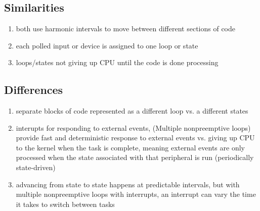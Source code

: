 \section{}
\begin{comment}
  Multiple Nonpreemptive Loops with Interrupts (cont’d)
• Advantages:
– Guaranteed minimum polling frequency for each
input or device
– Guaranteed maximum response time for polled
inputs and devices
– External events are handled promptly and
deterministically using hardware-triggered interrupts.
• Disadvantages:
– Some devices may be polled faster than necessary,
which is wasteful of the processor’s time.
– The one software thread has less cohesion because
it now handles more than one loop. A state variable
keeps track of the timer ISR calls and the active loop.

\end{comment}


\subsection*{Similarities}
\begin{enumerate}
  \item both use harmonic intervals to move between different sections of code
  \item each polled input or device is assigned to one loop or state
  \item loops/states not giving up CPU until the code is done processing
\end{enumerate}

\subsection*{Differences}
\begin{enumerate}
  \item separate blocks of code represented as a different loop vs. a different
    states
  \item interupts for responding to external events, (Multiple nonpreemptive
    loops) provide fast and deterministic response to external events vs. giving
    up CPU to the kernel when the task is complete, meaning external events are
    only processed when the state associated with that peripheral is run
    (periodically state-driven)
  \item advancing from state to state happens at predictable intervals, but with
    multiple nonpreemptive loops with interrupts, an interrupt can vary the time
    it takes to switch between tasks
\end{enumerate}
